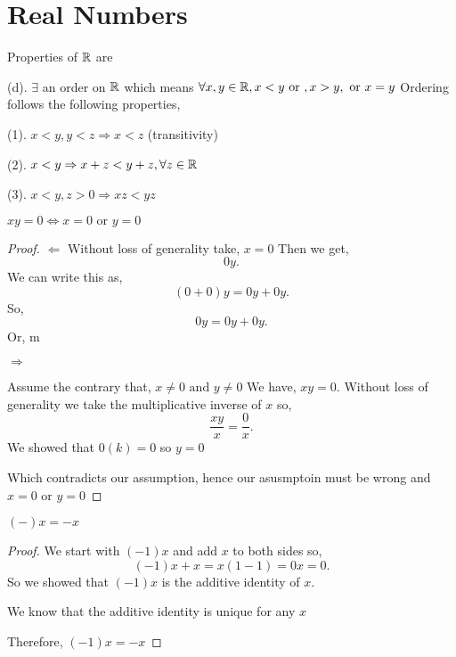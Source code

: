 \chapter*{Real Numbers}
\begin{definition} Properties of $\mathbb{R}$ are
    
    
    
    (d). $\exists$ an order on  $\mathbb{R}$ which means $\forall x,y \in \mathbb{R}, x < y \text{ or }, x > y, \text{ or } x = y$
    Ordering follows the following properties, 

    \qquad (1). $x < y, y < z \Rightarrow x < z$ (transitivity)
    
    \qquad (2). $x < y \Rightarrow x + z < y + z, \forall z \in \mathbb{R}$
    
    \qquad (3). $x < y, z > 0 \Rightarrow xz < yz$
\end{definition}

\begin{theorem}
    $xy = 0 \iff x = 0 \text{ or } y = 0 $ 
\end{theorem}

\begin{proof} 
    $\Leftarrow$
    Without loss of generality take, $x = 0$
    Then we get,  \[
        0y
    .\] 
    We can write this as, \[
        (0 + 0)y = 0y + 0y
    .\] 
    So, \[
    0y = 0y + 0y
    .\] 
    Or, m

    $\Rightarrow$

    Assume the contrary that, $x \neq 0 \text{ and } y \neq 0$ 
    We have, $xy = 0$.
    Without loss of generality we take the multiplicative inverse of  $x$ so,
     \[
    \frac{xy}{x} = \frac{0}{x}
    .\] 
    We showed that $0(k) = 0$ so  $y = 0$

    Which contradicts our assumption, hence our asusmptoin must be wrong and  $x = 0 \text{ or } y = 0$
    
\end{proof}
\begin{theorem}
    $(-)x = -x$
\end{theorem}

\begin{proof}
    We start with $(-1)x$ and add $x$ to both sides so,  \[
        (-1)x + x = x (1 - 1) = 0x = 0
    .\] 
    So we showed that $(-1)x$ is the additive identity of $x$. 

    We know that the additive identity is unique for any  $x$

    Therefore,  $(-1)x = -x$
\end{proof}

